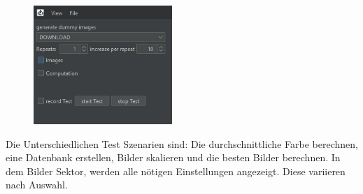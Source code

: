 \begin{figure}[h]
    \centering
    \includegraphics[height=4.5cm]{images/Bedienungsanleitung/test Mode UI.png}
    \label{Testbereich}
\end{figure}

Die Unterschiedlichen Test Szenarien sind: Die durchschnittliche Farbe berechnen, eine Datenbank erstellen, Bilder skalieren und die besten Bilder berechnen. In dem Bilder Sektor, werden alle nötigen Einstellungen angezeigt. Diese variieren nach Auswahl.

\begin{figure}[h]
    \centering
    \label{Einstellungen}
\end{figure}

